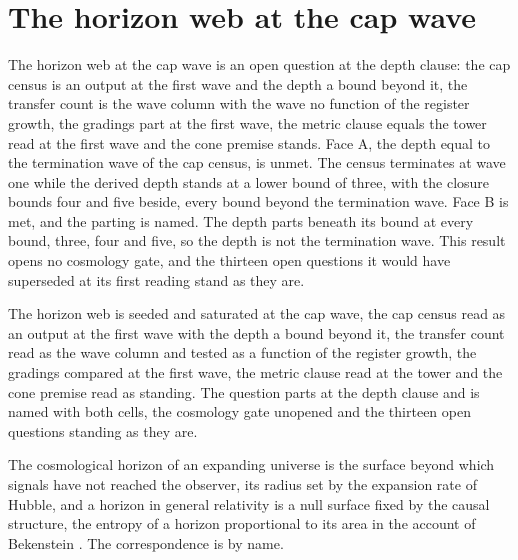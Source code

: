\section{The horizon web at the cap wave}\label{mod:X-3-D536690-w-hwcw}
\begin{chwall}\label{box:X-3-D536690-w-hwcw:1}
The horizon web at the cap wave is an open question at the depth clause: the cap census is an output at the first wave and the depth a bound beyond it, the transfer count is the wave column with the wave no function of the register growth, the gradings part at the first wave, the metric clause equals the tower read at the first wave and the cone premise stands. Face A, the depth equal to the termination wave of the cap census, is unmet. The census terminates at wave one while the derived depth stands at a lower bound of three, with the closure bounds four and five beside, every bound beyond the termination wave. Face B is met, and the parting is named. The depth parts beneath its bound at every bound, three, four and five, so the depth is not the termination wave. This result opens no cosmology gate, and the thirteen open questions it would have superseded at its first reading stand as they are.
\end{chwall}
The horizon web is seeded and saturated at the cap wave, the cap census read as an output at the first wave with the depth a bound beyond it, the transfer count read as the wave column and tested as a function of the register growth, the gradings compared at the first wave, the metric clause read at the tower and the cone premise read as standing. The question parts at the depth clause and is named with both cells, the cosmology gate unopened and the thirteen open questions standing as they are.
\begin{chbridge}
The cosmological horizon of an expanding universe is the surface beyond which signals have not reached the observer, its radius set by the expansion rate of Hubble, and a horizon in general relativity is a null surface fixed by the causal structure, the entropy of a horizon proportional to its area in the account of Bekenstein \cite{Hubble1929,Bekenstein1973}. The correspondence is by name.
\end{chbridge}
